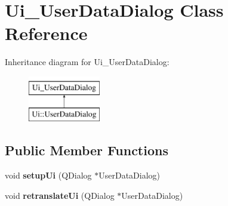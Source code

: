 \hypertarget{classUi__UserDataDialog}{\section{Ui\-\_\-\-User\-Data\-Dialog Class Reference}
\label{classUi__UserDataDialog}
}
Inheritance diagram for Ui\-\_\-\-User\-Data\-Dialog\-:\begin{figure}[H]
\begin{center}
\leavevmode
\includegraphics[height=2.000000cm]{d4/db3/classUi__UserDataDialog}
\end{center}
\end{figure}
\subsection*{Public Member Functions}
\begin{DoxyCompactItemize}
\item 
\hypertarget{classUi__UserDataDialog_a92ee7157128cb2378f38430048905f1e}{void {\bfseries setup\-Ui} (Q\-Dialog $\ast$User\-Data\-Dialog)}\label{classUi__UserDataDialog_a92ee7157128cb2378f38430048905f1e}

\item 
\hypertarget{classUi__UserDataDialog_a75761100f3c69d59a79323a360620ec0}{void {\bfseries retranslate\-Ui} (Q\-Dialog $\ast$User\-Data\-Dialog)}\label{classUi__UserDataDialog_a75761100f3c69d59a79323a360620ec0}

\end{DoxyCompactItemize}

